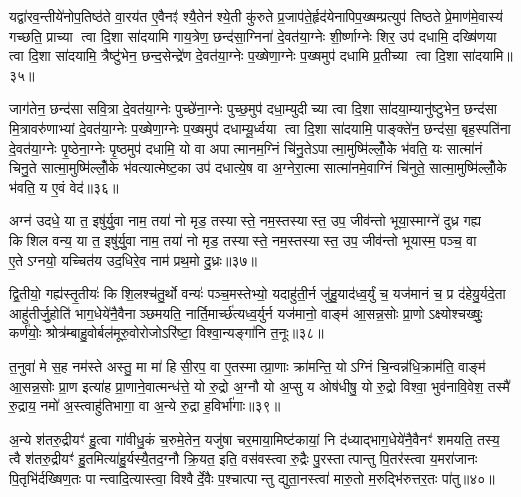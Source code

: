 यद्वा॑रव॒न्तीये॑नोप॒तिष्ठ॑ते वा॒रय॑त ए॒वैनꣵ॑ श्यै॒तेन॑ श्ये॒ती कु॑रुते प्र॒जाप॑ते॒र्\mbox{}हृद॑येनापिप॒ख्षम्प्रत्युप॑ तिष्ठते प्रे॒माण॑मे॒वास्य॑ गच्छति॒ प्राच्या त्वा दि॒शा सा॑दयामि गाय॒त्रेण॒ छन्द॑सा॒ग्निना॑ दे॒वत॑या॒ग्नेः शी॒र्ष्णाग्नेः शिर॒ उप॑ दधामि॒ दख्षि॑णया त्वा दि॒शा सा॑दयामि॒ त्रैष्टु॑भेन॒ छन्द॒सेन्द्रे॑ण दे॒वत॑या॒ग्नेः प॒ख्षेणा॒ग्नेः प॒ख्षमुप॑ दधामि प्र॒तीच्या त्वा दि॒शा सा॑दयामि॥३५॥

जाग॑तेन॒ छन्द॑सा सवि॒त्रा दे॒वत॑या॒ग्नेः पुच्छे॑ना॒ग्नेः पुच्छ॒मुप॑ दधा॒म्युदीच्या त्वा दि॒शा सा॑दया॒म्यानु॑ष्टुभेन॒ छन्द॑सा मि॒त्रावरु॑णाभ्यां दे॒वत॑या॒ग्नेः प॒ख्षेणा॒ग्नेः प॒ख्षमुप॑ दधाम्यू॒र्ध्वया त्वा दि॒शा सा॑दयामि॒ पाङ्क्ते॑न॒ छन्द॑सा॒ बृह॒स्पति॑ना दे॒वत॑या॒ग्नेः पृ॒ष्ठेना॒ग्नेः पृ॒ष्ठमुप॑ दधामि॒ यो वा अपात्मानम॒ग्निं चि॑नु॒तेऽपात्मा॒मुष्मि॑ल्लोँ॒के भ॑वति॒ यः सात्मा॑नं चिनु॒ते सात्मा॒मुष्मि॑ल्लोँ॒के भ॑वत्यात्मेष्ट॒का उप॑ दधात्ये॒ष वा अ॒ग्नेरा॒त्मा सात्मा॑नमे॒वाग्निं चि॑नुते॒ सात्मा॒मुष्मि॑ल्लोँ॒के भ॑वति॒ य ए॒वं वेद॑॥३६॥

{\anuvakamend[{श्यै॒त॒त्वं प्र॒तीच्या त्वा दि॒शा सा॑दयामि॒ यः सात्मा॑नञ्चिनु॒ते द्वाविꣳ॑शतिश्च॥८॥}]}

अग्न॑ उदधे॒ या त॒ इषु॑र्यु॒वा नाम॒ तया॑ नो मृड॒ तस्यास्ते॒ नम॒स्तस्यास्त॒ उप॒ जीव॑न्तो भूया॒स्माग्ने॑ दुध्र गह्य किशिल वन्य॒ या त॒ इषु॑र्यु॒वा नाम॒ तया॑ नो मृड॒ तस्यास्ते॒ नम॒स्तस्यास्त॒ उप॒ जीव॑न्तो भूयास्म॒ पञ्च॒ वा ए॒तेऽग्नयो॒ यच्चित॑य उद॒धिरे॒व नाम॑ प्रथ॒मो दु॒ध्रः॥३७॥

द्वि॒तीयो॒ गह्य॑स्तृ॒तीयः॑ किशि॒लश्च॑तु॒र्थो वन्यः॑ पञ्च॒मस्तेभ्यो॒ यदाहु॑ती॒र्न जु॑हु॒याद॑ध्व॒र्युं च॒ यज॑मानं च॒ प्र द॑हेयु॒र्यदे॒ता आहु॑तीर्जु॒होति॑ भाग॒धेये॑नै॒वैनाञ्छमयति॒ नार्ति॒मार्च्छ॑त्यध्व॒र्युर्न यज॑मानो॒ वाङ्म॑ आ॒सन्न॒सोः प्रा॒णोऽक्ष्योश्चख्षुः॒ कर्ण॑योः॒ श्रोत्र॑म्बाहु॒वोर्बल॑मूरु॒वोरोजोऽरि॑ष्टा॒ विश्वा॒न्यङ्गा॑नि त॒नूः॥३८॥

त॒नुवा॑ मे स॒ह नम॑स्ते अस्तु॒ मा मा॑ हिसी॒रप॒ वा ए॒तस्मात्प्रा॒णाः क्रा॑मन्ति॒ योऽग्निं चि॒न्वन्न॑धि॒क्राम॑ति॒ वाङ्म॑ आ॒सन्न॒सोः प्रा॒ण इत्या॑ह प्रा॒णाने॒वात्मन्ध॑त्ते॒ यो रु॒द्रो अ॒ग्नौ यो अ॒प्सु य ओष॑धीषु॒ यो रु॒द्रो विश्वा॒ भुव॑नावि॒वेश॒ तस्मै॑ रु॒द्राय॒ नमो॑ अ॒स्त्वाहु॑तिभागा॒ वा अ॒न्ये रु॒द्रा ह॒विर्भा॑गाः॥३९॥

अ॒न्ये श॑तरु॒द्रीयꣳ॑ हु॒त्वा गा॑वीधु॒कं च॒रुमे॒तेन॒ यजु॑षा चर॒माया॒मिष्ट॑कायां॒ नि द॑ध्याद्भाग॒धेये॑नै॒वैनꣳ॑ शमयति॒ तस्य॒ त्वै श॑तरु॒द्रीयꣳ॑ हु॒तमित्या॑हु॒र्यस्यै॒तद॒ग्नौ क्रि॒यत॒ इति॒ वस॑वस्त्वा रु॒द्रैः पु॒रस्तात्पान्तु पि॒तर॑स्त्वा य॒मरा॑जानः पि॒तृभि॑र्दख्षिण॒तः पान्त्वादि॒त्यास्त्वा॒ विश्वैर्दे॒वैः प॒श्चात्पान्तु द्युता॒नस्त्वा॑ मारु॒तो म॒रुद्भि॑रुत्तर॒तः पा॑तु॥४०॥

